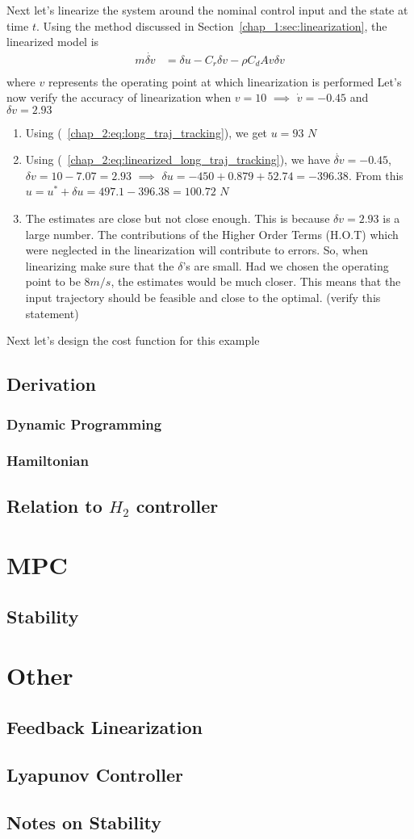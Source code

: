 Next let's linearize the system around the nominal control input and the state at time $t$.
Using the method discussed in Section~\ref{chap_1:sec:linearization}, the linearized model is
\begin{align}
    m\dot{\delta v} &= \delta u - C_r  \delta v - \rho C_d  A  v  \delta v \label{chap_2:eq:linearized_long_traj_tracking} \\
\end{align}
where $v$ represents the operating point at which linearization is performed
Let's now verify the accuracy of linearization when $v=10$ $\implies$ $\dot{v}=-0.45$ and $\delta v = 2.93$
\begin{enumerate}
    \item Using (~\ref{chap_2:eq:long_traj_tracking}), we get $u=93$ $N$
    \item Using (~\ref{chap_2:eq:linearized_long_traj_tracking}), we have $\dot{\delta v} = -0.45$, $\delta v = 10-7.07=2.93$ $\implies$ $\delta u = -450 + 0.879 + 52.74 = -396.38 $. From this $u = u^{*} + \delta u = 497.1 - 396.38 = 100.72$ $N$
    \item The estimates are close but not close enough. This is because $\delta v = 2.93$ is a large number. The contributions of the Higher Order Terms (H.O.T) which were neglected in the linearization will contribute to errors. So, when linearizing make sure that the $\delta$'s are small. Had we chosen the operating point to be $8 m/s$, the estimates would be much closer. This means that the input trajectory should be feasible and close to the optimal. (verify this statement)
\end{enumerate}
Next let's design the cost function for this example
\subsection{Derivation}
\subsubsection{Dynamic Programming}
\subsubsection{Hamiltonian}
\subsection{Relation to $H_2$ controller}
\section{MPC}
\subsection{Stability}
\section{Other}
\subsection{Feedback Linearization}
\subsection{Lyapunov Controller}
\subsection{Notes on Stability}